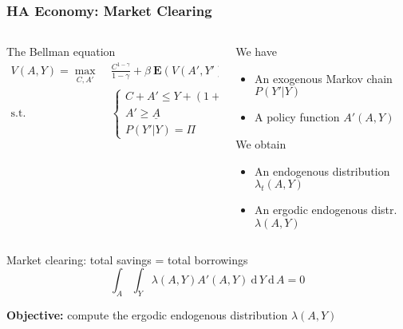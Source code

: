 \documentclass[10pt, aspectratio=1610, natbib, handout]{beamer}
\newcommand{\E}{\mathbf{E}}
\begin{document}
  \begin{frame}
    \frametitle{HA Economy: Market Clearing}

    \begin{columns}[T]
      \begin{column}{0.48\textwidth}
        The Bellman equation
        \begin{align*}
          V(A, Y) = \max_{C, A'} &\; \frac{C^{1-\gamma}}{1-\gamma} + \beta\ \E \left( V(A', Y') \middle| A, Y \right) \\
          \text{s.t.} &\;
          \begin{cases}
            C + A' \leq Y + (1 + r) A \\
            A' \geq \underline{A} \\
            P(Y' | Y) = \Pi
          \end{cases}
        \end{align*}
      \end{column}
      \begin{column}{0.48\textwidth}
        We have
        \begin{itemize}
          \item An exogenous Markov chain $P(Y' | Y)$
          \item A policy function $A'(A, Y)$
        \end{itemize}
        \vspace{1em}
        We obtain
        \begin{itemize}
          \item An endogenous distribution $\lambda_t(A, Y)$
          \item An ergodic endogenous distr.~$\lambda(A, Y)$
        \end{itemize}
      \end{column}
    \end{columns}

    \vfill\pause

    Market clearing: total savings = total borrowings
    \begin{equation*}
      \int_A \int_Y \lambda(A, Y) A'(A, Y)\ \text{d}\, Y\ \text{d}\, A = 0
    \end{equation*}

    \vfill\pause

    \textbf{Objective:} compute the ergodic endogenous distribution $\lambda(A, Y)$
  \end{frame}
\end{document}
